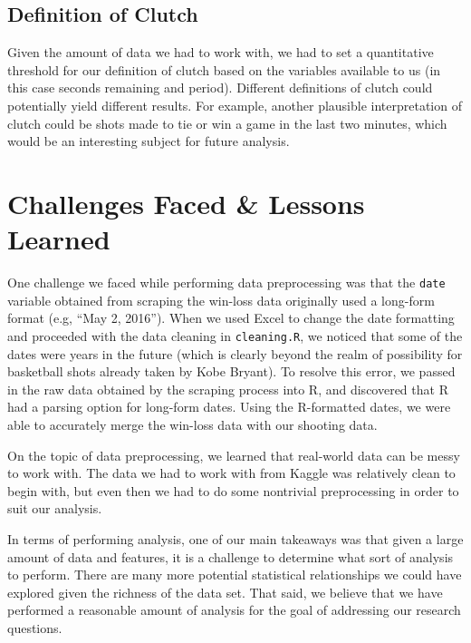 \documentclass[paper=a4, fontsize=11pt]{scrartcl} %
\numberwithin{equation}{section} %
\numberwithin{figure}{section} %
\numberwithin{table}{section} %
\begin{document}
\subsection{Definition of Clutch}
Given the amount of data we had to work with, we had to set a quantitative threshold for our definition of clutch based on the variables available to us (in this case seconds remaining and period). Different definitions of clutch could potentially yield different results. For example, another plausible interpretation of clutch could be shots made to tie or win a game in the last two minutes, which would be an interesting subject for future analysis.

\section{Challenges Faced \& Lessons Learned}
\hspace*{1cm}One challenge we faced while performing data preprocessing was that the \texttt{date} variable obtained from scraping the win-loss data originally used a long-form format (e.g, ``May 2, 2016''). When we used Excel to change the date formatting and proceeded with the data cleaning in \texttt{cleaning.R}, we noticed that some of the dates were years in the future (which is clearly beyond the realm of possibility for basketball shots already taken by Kobe Bryant). To resolve this error, we passed in the raw data obtained by the scraping process into R, and discovered that R had a parsing option for long-form dates. Using the R-formatted dates, we were able to accurately merge the win-loss data with our shooting data. 

\hspace*{1cm}On the topic of data preprocessing, we learned that real-world data can be messy to work with. The data we had to work with from Kaggle was relatively clean to begin with, but even then we had to do some nontrivial preprocessing in order to suit our analysis.

\hspace*{1cm}In terms of performing analysis, one of our main takeaways was that given a large amount of data and features, it is a challenge to determine what sort of analysis to perform. There are many more potential statistical relationships we could have explored given the richness of the data set. That said, we believe that we have performed a reasonable amount of analysis for the goal of addressing our research questions.
\end{document}
